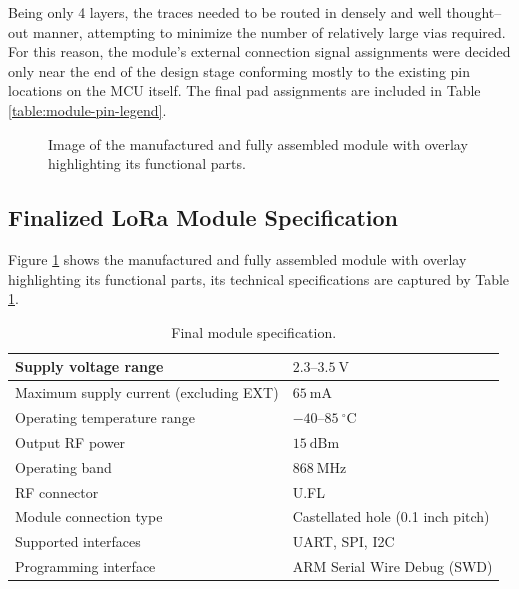 Being only 4 layers, the traces needed to be routed in densely and well thought--out manner, attempting to minimize the number of relatively large vias required. For this reason, the module's external connection signal assignments were decided only near the end of the design stage conforming mostly to the existing pin locations on the MCU itself. The final pad assignments are included in Table \ref{table:module-pin-legend}.

\begin{figure}
    
    \caption{\label{fig:module-v0.1}Image of the manufactured and fully assembled module with overlay highlighting its functional parts.}
\end{figure}

\subsection{Finalized LoRa Module Specification}
Figure \ref{fig:module-v0.1} shows the manufactured and fully assembled module with overlay highlighting its functional parts, its technical specifications are captured by Table \ref{table:module-specification}.

\begin{table}[p]
\begin{center}
\caption{\label{table:module-specification}Final module specification.}
    \begin{tabular}{|l|l|} \hline
    Supply voltage range                    & $2.3\text{--}3.5~\mathrm{V}$\\ \hline
    Maximum supply current (excluding EXT)  & $65~\mathrm{mA}$\\ \hline
    Operating temperature range             & $-40\text{--}85~\mathrm{^\circ C}$\\ \hline
    Output RF power                         & $15~\mathrm{dBm}$\\ \hline
    Operating band                          & $868~\mathrm{MHz}$\\ \hline
    RF connector                            & U.FL \\ \hline
    Module connection type                  & Castellated hole (0.1 inch pitch) \\ \hline
    Supported interfaces                    & UART, SPI, I2C \\ \hline
    Programming interface                   & ARM Serial Wire Debug (SWD) \\ \hline
    \end{tabular}
\end{center}
\end{table}


